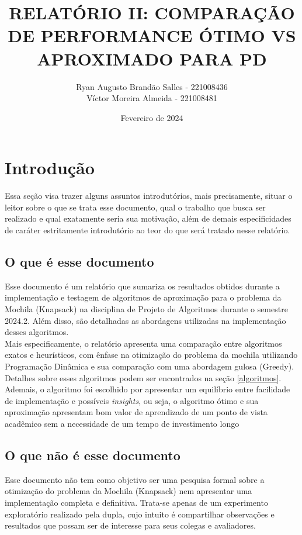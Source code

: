 \documentclass{article}
\title{RELATÓRIO II: COMPARAÇÃO DE PERFORMANCE ÓTIMO VS APROXIMADO PARA PD}
\author{
    Ryan Augusto Brandão Salles - 221008436\\
    Víctor Moreira Almeida - 221008481\\
}
\date{Fevereiro de 2024}
\begin{document}
\maketitle

\section{Introdução}
    Essa seção visa trazer alguns assuntos introdutórios, mais precisamente, situar o leitor sobre o que se trata esse documento, qual o trabalho que busca ser realizado e qual exatamente seria sua motivação, além de demais especificidades de caráter estritamente introdutório ao teor do que será tratado nesse relatório.

\subsection{O que é esse documento}
    Esse documento é um relatório que sumariza os resultados obtidos durante a implementação e testagem de algoritmos de aproximação para o problema da Mochila (Knapsack) na disciplina de Projeto de Algoritmos durante o semestre 2024.2. Além disso, são detalhadas as abordagens utilizadas na implementação desses algoritmos.\\
    
    Mais especificamente, o relatório apresenta uma comparação entre algoritmos exatos e heurísticos, com ênfase na otimização do problema da mochila utilizando Programação Dinâmica e sua comparação com uma abordagem gulosa (Greedy). Detalhes sobre esses algoritmos podem ser encontrados na seção \ref{algoritmos}.\\

    Ademais, o algoritmo foi escolhido por apresentar um equilíbrio entre facilidade de implementação e possíveis \textit{insights}, ou seja, o algoritmo ótimo e sua aproximação apresentam bom valor de aprendizado de um ponto de vista acadêmico sem a necessidade de um tempo de investimento longo\\

\subsection{O que não é esse documento}
    Esse documento não tem como objetivo ser uma pesquisa formal sobre a otimização do problema da Mochila (Knapsack) nem apresentar uma implementação completa e definitiva. Trata-se apenas de um experimento exploratório realizado pela dupla, cujo intuito é compartilhar observações e resultados que possam ser de interesse para seus colegas e avaliadores.
    
\end{document}
